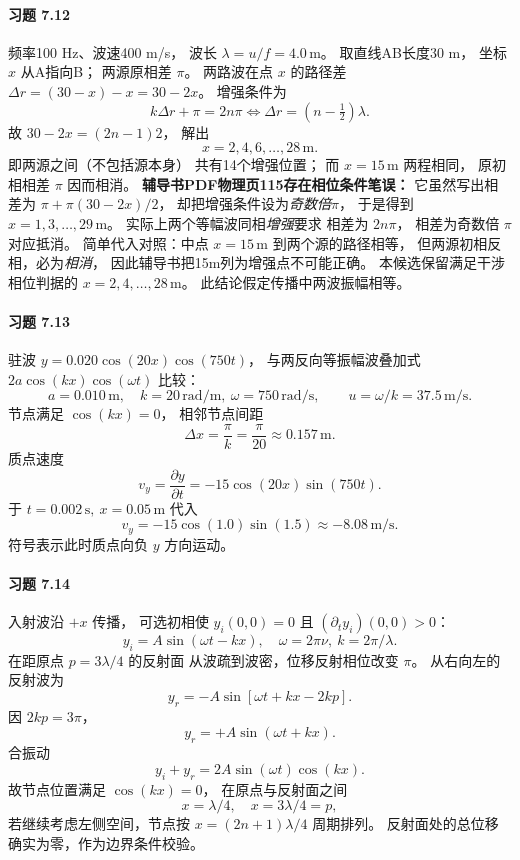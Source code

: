 \paragraph{习题 7.12}
频率100 Hz、波速400 m/s，
波长
\(\lambda=u/f=4.0\,\mathrm m\)。
取直线AB长度30 m，
坐标 \(x\) 从A指向B；
两源原相差 \(\pi\)。
两路波在点 \(x\) 的路径差
\(\Delta r=(30-x)-x=30-2x\)。
增强条件为
\[
 k\Delta r+\pi=2n\pi
 \Longleftrightarrow
 \Delta r=(n-\tfrac12)\lambda.
\]
故
\(30-2x=(2n-1)2\)，
解出
\[
 \boxed{x=2,4,6,\ldots,28\,\mathrm m}.
\]
即两源之间（不包括源本身）
共有14个增强位置；
而 \(x=15\,\mathrm m\) 两程相同，
原初相相差 \(\pi\) 因而相消。
\textbf{辅导书PDF物理页115存在相位条件笔误：}
它虽然写出相差为
\(\pi+\pi(30-2x)/2\)，
却把增强条件设为\emph{奇数倍}\(\pi\)，
于是得到 \(x=1,3,\ldots,29\,\mathrm m\)。
实际上两个等幅波同相\emph{增强}要求
相差为 \(2n\pi\)，
相差为奇数倍 \(\pi\) 对应抵消。
简单代入对照：中点 \(x=15\,\mathrm m\)
到两个源的路径相等，
但两源初相反相，必为\emph{相消}，
因此辅导书把15m列为增强点不可能正确。
本候选保留满足干涉相位判据的
\(x=2,4,\ldots,28\,\mathrm m\)。
此结论假定传播中两波振幅相等。

\paragraph{习题 7.13}
驻波
\(y=0.020\cos(20x)\cos(750t)\)，
与两反向等振幅波叠加式
\(2a\cos(kx)\cos(\omega t)\) 比较：
\[
 \boxed{a=0.010\,\mathrm m,\quad
 k=20\,\mathrm{rad/m},\
 \omega=750\,\mathrm{rad/s}},\qquad
 \boxed{u=\omega/k=37.5\,\mathrm{m/s}}.
\]
节点满足
\(\cos(kx)=0\)，
相邻节点间距
\[
 \boxed{\Delta x=\frac\pi k
 =\frac\pi{20}\approx0.157\,\mathrm m}.
\]
质点速度
\[
 v_y=\frac{\partial y}{\partial t}
 =-15\cos(20x)\sin(750t).
\]
于
\(t=0.002\,\mathrm s,\ x=0.05\,\mathrm m\)
代入
\[
 \boxed{v_y=-15\cos(1.0)\sin(1.5)
 \approx-8.08\,\mathrm{m/s}}.
\]
符号表示此时质点向负 \(y\) 方向运动。

\paragraph{习题 7.14}
入射波沿 \(+x\) 传播，
可选初相使
\(y_i(0,0)=0\) 且
\((\partial_ty_i)(0,0)>0\)：
\[
 \boxed{y_i=A\sin(\omega t-kx)},
\quad
 \omega=2\pi\nu,\ k=2\pi/\lambda.
\]
在距原点
\(p=3\lambda/4\) 的反射面
从波疏到波密，位移反射相位改变 \(\pi\)。
从右向左的反射波为
\[
 y_r=-A\sin[\omega t+kx-2kp].
\]
因 \(2kp=3\pi\)，
\[
 \boxed{y_r=+A\sin(\omega t+kx)}.
\]
合振动
\[
 y_i+y_r
 =2A\sin(\omega t)\cos(kx).
\]
故节点位置满足
\(\cos(kx)=0\)，
在原点与反射面之间
\[
 \boxed{x=\lambda/4,\quad
 x=3\lambda/4=p},
\]
若继续考虑左侧空间，节点按
\(x=(2n+1)\lambda/4\) 周期排列。
反射面处的总位移确实为零，作为边界条件校验。

